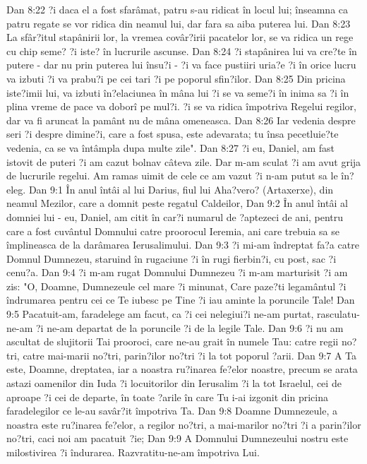 Dan 8:22  ?i daca el a fost sfarâmat, patru s-au ridicat în locul lui; înseamna ca patru regate se vor ridica din neamul lui, dar fara sa aiba puterea lui.
Dan 8:23  La sfâr?itul stapânirii lor, la vremea covâr?irii pacatelor lor, se va ridica un rege cu chip seme? ?i iste? în lucrurile ascunse.
Dan 8:24  ?i stapânirea lui va cre?te în putere - dar nu prin puterea lui însu?i - ?i va face pustiiri uria?e ?i în orice lucru va izbuti ?i va prabu?i pe cei tari ?i pe poporul sfin?ilor.
Dan 8:25  Din pricina iste?imii lui, va izbuti în?elaciunea în mâna lui ?i se va seme?i în inima sa ?i în plina vreme de pace va doborî pe mul?i. ?i se va ridica împotriva Regelui regilor, dar va fi aruncat la pamânt nu de mâna omeneasca.
Dan 8:26  Iar vedenia despre seri ?i despre dimine?i, care a fost spusa, este adevarata; tu însa pecetluie?te vedenia, ca se va întâmpla dupa multe zile".
Dan 8:27  ?i eu, Daniel, am fast istovit de puteri ?i am cazut bolnav câteva zile. Dar m-am sculat ?i am avut grija de lucrurile regelui. Am ramas uimit de cele ce am vazut ?i n-am putut sa le în?eleg.
Dan 9:1  În anul întâi al lui Darius, fiul lui Aha?vero? (Artaxerxe), din neamul Mezilor, care a domnit peste regatul Caldeilor,
Dan 9:2  În anul întâi al domniei lui - eu, Daniel, am citit în car?i numarul de ?aptezeci de ani, pentru care a fost cuvântul Domnului catre proorocul Ieremia, ani care trebuia sa se împlineasca de la darâmarea Ierusalimului.
Dan 9:3  ?i mi-am îndreptat fa?a catre Domnul Dumnezeu, staruind în rugaciune ?i în rugi fierbin?i, cu post, sac ?i cenu?a.
Dan 9:4  ?i m-am rugat Domnului Dumnezeu ?i m-am marturisit ?i am zis: "O, Doamne, Dumnezeule cel mare ?i minunat, Care paze?ti legamântul ?i îndrumarea pentru cei ce Te iubesc pe Tine ?i iau aminte la poruncile Tale!
Dan 9:5  Pacatuit-am, faradelege am facut, ca ?i cei nelegiui?i ne-am purtat, rasculatu-ne-am ?i ne-am departat de la poruncile ?i de la legile Tale.
Dan 9:6  ?i nu am ascultat de slujitorii Tai prooroci, care ne-au grait în numele Tau: catre regii no?tri, catre mai-marii no?tri, parin?ilor no?tri ?i la tot poporul ?arii.
Dan 9:7  A Ta este, Doamne, dreptatea, iar a noastra ru?inarea fe?elor noastre, precum se arata astazi oamenilor din Iuda ?i locuitorilor din Ierusalim ?i la tot Israelul, cei de aproape ?i cei de departe, în toate ?arile în care Tu i-ai izgonit din pricina faradelegilor ce le-au savâr?it împotriva Ta.
Dan 9:8  Doamne Dumnezeule, a noastra este ru?inarea fe?elor, a regilor no?tri, a mai-marilor no?tri ?i a parin?ilor no?tri, caci noi am pacatuit ?ie;
Dan 9:9  A Domnului Dumnezeului nostru este milostivirea ?i îndurarea. Razvratitu-ne-am împotriva Lui.

